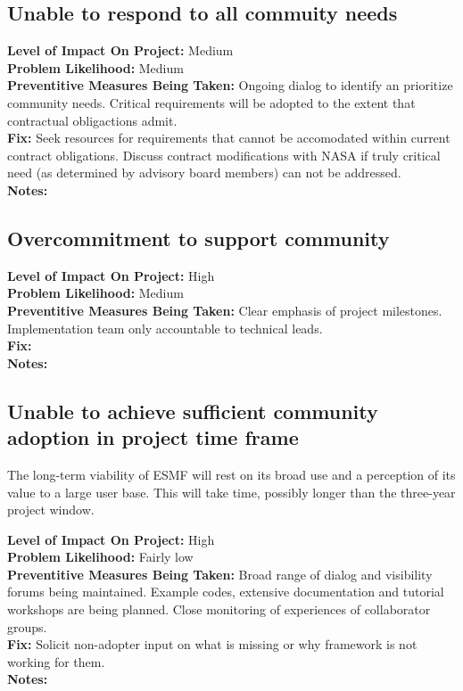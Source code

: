 \documentclass[english]{article}
\newcommand{\sreq}[1]{\subsection{\hspace{.2in}#1}}
\newenvironment
{reqlist}
{\begin{list} {} {} \rm \item[]}
{\end{list}}
\begin{document}
\sreq{Unable to respond to all commuity needs}
\begin{reqlist}
{\bf Level of Impact On Project:}  Medium \\
{\bf Problem Likelihood:} Medium \\
{\bf Preventitive Measures Being Taken:} Ongoing dialog to identify an prioritize
community needs. Critical requirements will be adopted to the extent
that contractual obligactions admit.\\
{\bf Fix:} Seek resources for requirements that cannot be accomodated within current
contract obligations. Discuss contract modifications with NASA if truly critical
need (as determined by advisory board members) can not be addressed. \\
{\bf Notes:} \\
\end{reqlist}

\sreq{Overcommitment to support community}
\begin{reqlist}
{\bf Level of Impact On Project:} High \\
{\bf Problem Likelihood:} Medium \\
{\bf Preventitive Measures Being Taken:} Clear emphasis of project milestones. Implementation
team only accountable to technical leads.\\
{\bf Fix:} \\
{\bf Notes:} \\
\end{reqlist}

\sreq{Unable to achieve sufficient community adoption in project time frame}
The long-term viability of ESMF will rest on its broad use and a perception of
its value to a large user base. This will take time, possibly longer 
than the three-year project window.
\begin{reqlist}
{\bf Level of Impact On Project:}  High \\
{\bf Problem Likelihood:} Fairly low \\
{\bf Preventitive Measures Being Taken:} Broad range of dialog and visibility 
forums being maintained. Example codes, extensive documentation and tutorial
workshops are being planned.
Close monitoring of experiences of collaborator groups.  \\
{\bf Fix:} Solicit non-adopter input on what is missing or why framework is not working for them.\\
{\bf Notes:} \\
\end{reqlist}
\end{document}
